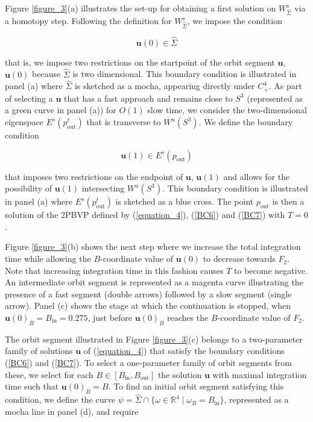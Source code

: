 \documentclass{ws-ijbc}
\begin{document}
Figure \ref{figure_3}(a) illustrates the set-up for obtaining a first solution on $W^s_{\widehat{\Sigma}}$ via a homotopy step.  Following the definition for $W^s_{\widehat{\Sigma}}$, we impose the condition
    
\begin{equation}
\mathbf{u}(0) \in \widehat{\Sigma}
\label{BC6}
\end{equation}
    
 \noindent
that is, we impose two restrictions on the startpoint of the orbit segment $\mathbf{u}$, $\mathbf{u}(0)$ because $\widehat{\Sigma}$ is two dimensional.  This boundary condition is illustrated in panel (a) where $\widehat{\Sigma}$ is sketched as a mocha, appearing directly under $C^4_+$.  As part of selecting a $\mathbf{u}$ that has a fast approach and remains close to $S^3$ (represented as a green curve in panel (a)) for $O(1)$ slow time, we consider the two-dimensional eigenspace $E^s(p^t_{\text{out}})$ that is transverse to $W^u(S^3)$.  We define the boundary condition
 
\begin{equation}
\mathbf{u}(1) \in E^s(p_{\text{out}})
\label{BC7}
\end{equation}
    
\noindent
that imposes two restrictions on the endpoint of $\mathbf{u}$, $\mathbf{u}(1)$ and allows for the possibility of $\mathbf{u}(1)$ intersecting $W^u(S^3)$.  This boundary condition is illustrated in panel (a) where $E^s(p^t_{\text{out}})$ is sketched as a blue cross.  The point $p_{\text{out}}$ is then a solution of the 2PBVP defined by (\ref{equation_4}), (\ref{BC6}) and (\ref{BC7}) with $T=0$.

Figure \ref{figure_3}(b) shows the next step where we increase the total integration time while allowing the $B$-coordinate value of $\mathbf{u}(0)$ to decrease towards $F_2$.  Note that increasing integration time in this fashion causes $T$ to become negative.  An intermediate orbit segment is represented as a magenta curve illustrating the presence of a fast segment (double arrows) followed by a slow segment (single arrow).  Panel (c) shows the stage at which the continuation is stopped, when $\mathbf{u}(0)_B = B_{\text{in}}=0.275$, just before $\mathbf{u}(0)_B$ reaches the $B$-coordinate value of $F_2$.
    
The orbit segment illustrated in Figure \ref{figure_3}(c) belongs to a two-parameter family of solutions $\mathbf{u}$ of (\ref{equation_4}) that satisfy the boundary conditions (\ref{BC6}) and (\ref{BC7}).  To select a one-parameter family of orbit segments from these, we select for each $B \in [B_{\text{in}}, B_{\text{out}}]$ the solution $\mathbf{u}$ with maximal integration time such that $\mathbf{u}(0)_B=B$.  To find an initial orbit segment satisfying this condition, we define the curve $\psi = \widehat{\Sigma}\cap \{ \omega \in \mathbb{R}^4 \; | \; \omega_B = B_{\text{in}}\}$, represented as a mocha line in panel (d), and require
    
\end{document}
